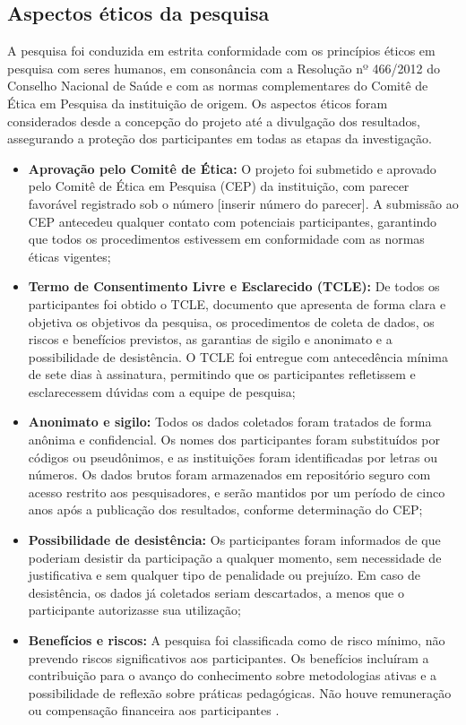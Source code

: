 \subsection{Aspectos éticos da pesquisa}
\label{subsec:aspectos_eticos}

A pesquisa foi conduzida em estrita conformidade com os princípios éticos em pesquisa com seres humanos, em consonância com a Resolução nº 466/2012 do Conselho Nacional de Saúde e com as normas complementares do Comitê de Ética em Pesquisa da instituição de origem. Os aspectos éticos foram considerados desde a concepção do projeto até a divulgação dos resultados, assegurando a proteção dos participantes em todas as etapas da investigação.

\begin{itemize}
    \item \textbf{Aprovação pelo Comitê de Ética:} O projeto foi submetido e aprovado pelo Comitê de Ética em Pesquisa (CEP) da instituição, com parecer favorável registrado sob o número [inserir número do parecer]. A submissão ao CEP antecedeu qualquer contato com potenciais participantes, garantindo que todos os procedimentos estivessem em conformidade com as normas éticas vigentes;
    \item \textbf{Termo de Consentimento Livre e Esclarecido (TCLE):} De todos os participantes foi obtido o TCLE, documento que apresenta de forma clara e objetiva os objetivos da pesquisa, os procedimentos de coleta de dados, os riscos e benefícios previstos, as garantias de sigilo e anonimato e a possibilidade de desistência. O TCLE foi entregue com antecedência mínima de sete dias à assinatura, permitindo que os participantes refletissem e esclarecessem dúvidas com a equipe de pesquisa;
    \item \textbf{Anonimato e sigilo:} Todos os dados coletados foram tratados de forma anônima e confidencial. Os nomes dos participantes foram substituídos por códigos ou pseudônimos, e as instituições foram identificadas por letras ou números. Os dados brutos foram armazenados em repositório seguro com acesso restrito aos pesquisadores, e serão mantidos por um período de cinco anos após a publicação dos resultados, conforme determinação do CEP;
    \item \textbf{Possibilidade de desistência:} Os participantes foram informados de que poderiam desistir da participação a qualquer momento, sem necessidade de justificativa e sem qualquer tipo de penalidade ou prejuízo. Em caso de desistência, os dados já coletados seriam descartados, a menos que o participante autorizasse sua utilização;
    \item \textbf{Benefícios e riscos:} A pesquisa foi classificada como de risco mínimo, não prevendo riscos significativos aos participantes. Os benefícios incluíram a contribuição para o avanço do conhecimento sobre metodologias ativas e a possibilidade de reflexão sobre práticas pedagógicas. Não houve remuneração ou compensação financeira aos participantes \cite{SANTOS2024}.
\end{itemize}

